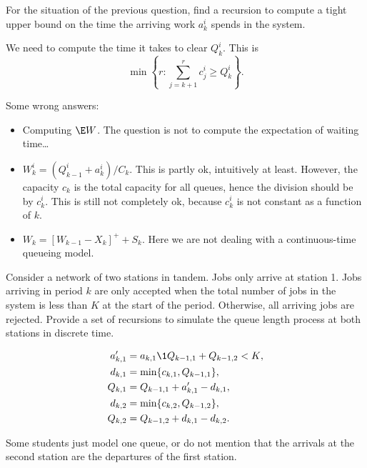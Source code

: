 \begin{exercise}[201704]
For the situation of the previous question, find a recursion to compute a tight upper bound on the time the arriving work $a_k^i$ spends in the system.
\begin{solution}
We need to compute the time it takes to clear $Q_k^i$. This is
\begin{equation*}
 \min\left\{r: \sum_{j=k+1}^r c_j^i \geq Q_k^i\right\}.
\end{equation*}

Some wrong answers:
\begin{itemize}
\item Computing $\E W$. The question is not to compute the expectation of waiting time\ldots
\item $W_k^i=(Q_{k-1}^i+a_k^i)/C_k$. This is partly ok, intuitively at least. However, the capacity $c_k$ is the total capacity for all queues, hence the division should be by $c_k^i$. This is still not completely ok, because $c_k^i$ is not constant as a function of $k$.
\item $W_k = [W_{k-1}-X_k]^+ + S_k$. Here we are not dealing with a continuous-time queueing model. 
\end{itemize}
\end{solution}
\end{exercise}


\begin{exercise}[201807]
Consider a network of two stations in tandem. Jobs only arrive at station 1. Jobs arriving in period $k$ are only accepted when the total number of jobs in the system is less than $K$ at the start of the period. Otherwise, all arriving jobs are rejected. Provide a set of recursions to simulate the queue length process at both stations in discrete time. 

\begin{solution}
 \begin{align*}
a_{k,1}' &= a_{k,1}\1{Q_{k-1, 1} + Q_{k-1,2} < K}, \\
 d_{k,1} &= \min\{c_{k,1}, Q_{k-1, 1}\}, \\
 Q_{k,1} &= Q_{k-1,1} + a_{k,1}' - d_{k,1},\\
 d_{k,2} &= \min\{c_{k,2}, Q_{k-1, 2}\}, \\
 Q_{k,2} &= Q_{k-1,2} + d_{k,1} - d_{k,2}.\\
 \end{align*}

Some students just model one queue, or do not mention that the arrivals at the second station are the departures of the first station.
\end{solution}
\end{exercise}


